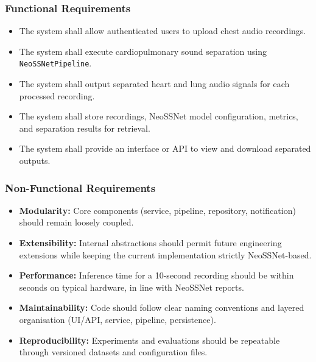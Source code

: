 \documentclass[12pt,a4paper]{report}
\begin{document}
\subsubsection*{Functional Requirements}
\begin{itemize}[nosep]
  \item The system shall allow authenticated users to upload chest audio recordings.
  \item The system shall execute cardiopulmonary sound separation using \texttt{NeoSSNetPipeline}.
  \item The system shall output separated heart and lung audio signals for each processed recording.
  \item The system shall store recordings, NeoSSNet model configuration, metrics, and separation results for retrieval.
  \item The system shall provide an interface or API to view and download separated outputs.
\end{itemize}

\subsubsection*{Non-Functional Requirements}
\begin{itemize}[nosep]
  \item \textbf{Modularity:} Core components (service, pipeline, repository, notification) should remain loosely coupled.
  \item \textbf{Extensibility:} Internal abstractions should permit future engineering extensions while keeping the current implementation strictly NeoSSNet-based.
  \item \textbf{Performance:} Inference time for a 10-second recording should be within seconds on typical hardware, in line with NeoSSNet reports.\citep{poh2024neossnet}
  \item \textbf{Maintainability:} Code should follow clear naming conventions and layered organisation (UI/API, service, pipeline, persistence).
  \item \textbf{Reproducibility:} Experiments and evaluations should be repeatable through versioned datasets and configuration files.
\end{itemize}
\end{document}

